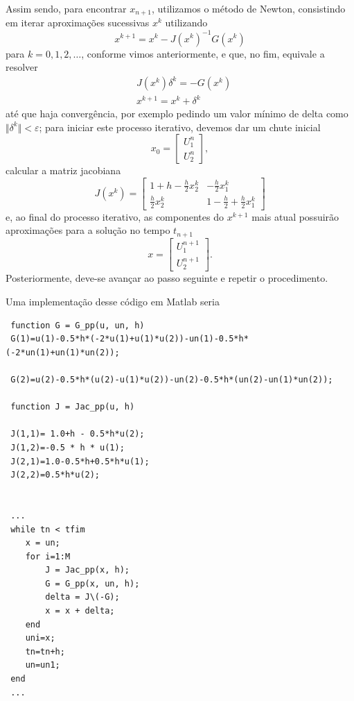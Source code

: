 \documentclass[../differential_methods.tex]{subfiles}
\begin{document}
\begin{example}
	Assim sendo, para encontrar \(x_{n+1}\), utilizamos o método de Newton, consistindo em iterar aproximações sucessivas \(x^{k}\) utilizando
	\[
		x^{k+1}=x^{k}-J(x^{k})^{-1}G(x^{k})
	\]
	para \(k=0,1,2,\dotsc \), conforme vimos anteriormente, e que, no fim, equivale a resolver
	\begin{align*}
		 & J(x^{k})\delta ^{k}=-G(x^{k}) \\
		 & x^{k+1}=x^{k}+\delta^{k}
	\end{align*}
	até que haja convergência, por exemplo pedindo um valor mínimo de delta como \(\Vert \delta^{k} \Vert< \varepsilon \); para iniciar este processo iterativo, devemos dar um chute inicial
	\[
		x_{0}=\begin{bmatrix}
			U_{1}^{n} \\
			U_{2}^{n}
		\end{bmatrix},
	\]
	calcular a matriz jacobiana
	\[
		J(x^{k})=\begin{bmatrix}
			1+h-\frac{h}{2}x_{2}^{k} & -\frac{h}{2}x_{1}^{k}              \\
			\frac{h}{2}x_{2}^{k}     & 1-\frac{h}{2}+\frac{h}{2}x_{1}^{k}
		\end{bmatrix}
	\]
	e, ao final do processo iterativo, as componentes do \(x^{k+1}\) mais atual possuirão aproximações para a solução no tempo \(t_{n+1}\)
	\[
		x= \begin{bmatrix}
			U_{1}^{n+1} \\
			U_{2}^{n+1}
		\end{bmatrix}.
	\]
	Posteriormente, deve-se avançar ao passo seguinte e repetir o procedimento.

	Uma implementação desse código em Matlab seria
	\begin{listing}[H]
		\begin{verbatim}
 function G = G_pp(u, un, h) 
 G(1)=u(1)-0.5*h*(-2*u(1)+u(1)*u(2))-un(1)-0.5*h*(-2*un(1)+un(1)*un(2)); 

 G(2)=u(2)-0.5*h*(u(2)-u(1)*u(2))-un(2)-0.5*h*(un(2)-un(1)*un(2)); 

 function J = Jac_pp(u, h)

 J(1,1)= 1.0+h - 0.5*h*u(2); 
 J(1,2)=-0.5 * h * u(1); 
 J(2,1)=1.0-0.5*h+0.5*h*u(1); 
 J(2,2)=0.5*h*u(2);


 ... 
 while tn < tfim 
    x = un;
    for i=1:M 
        J = Jac_pp(x, h); 
        G = G_pp(x, un, h); 
        delta = J\(-G); 
        x = x + delta; 
    end 
    uni=x; 
    tn=tn+h; 
    un=un1; 
 end 
 ...
 \end{verbatim}
	\end{listing}
\end{example}
\end{document}
